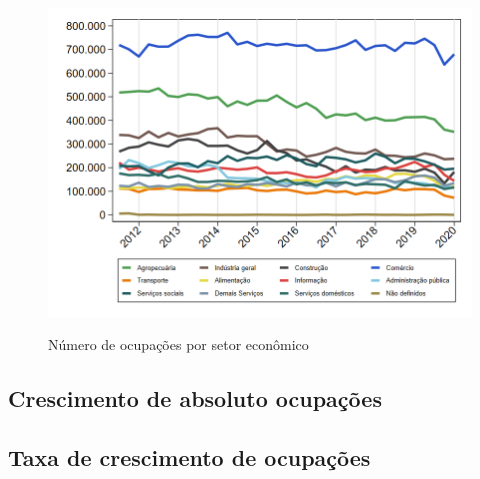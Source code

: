 \documentclass[10pt]{beamer}
\begin{document}
\begin{frame}
\textit{\hyperlink{indice_principal_amz_jovem}{}}
\begin{figure}
  \centering
  \includegraphics[width=.85\linewidth]{./../analysis/output/_amz_jovem_importancia_relativa.png}
  \label{_amz_jovem_importancia_relativa}
  \caption{{Número de ocupações por setor econômico}}
\end{figure}
\end{frame}

\subsection{Crescimento de absoluto ocupações}

\begin{frame}
\textit{\hyperlink{indice_principal_amz_jovem}{}}

\end{frame}


\begin{frame}
\textit{\hyperlink{indice_principal_amz_jovem}{}}

\end{frame}


\begin{frame}
\textit{\hyperlink{indice_principal_amz_jovem}{}}

\end{frame}

\subsection{Taxa de crescimento de ocupações}
\end{document}
